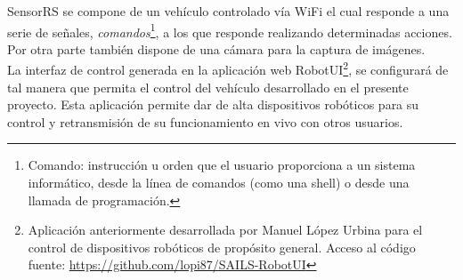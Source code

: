 SensorRS se compone de un vehículo controlado vía WiFi el cual responde a una serie de señales, \emph{comandos}\footnote{ Comando: instrucción u orden que el usuario proporciona a un sistema informático, 
desde la línea de comandos (como una shell) o desde una llamada de programación.}, a los que responde realizando determinadas acciones. Por otra parte también dispone de una cámara para la captura de imágenes.\\

La interfaz de control generada en la aplicación web RobotUI\footnote{ Aplicación anteriormente desarrollada por Manuel López Urbina para el control de dispositivos robóticos de propósito general. Acceso al 
código fuente: \url{https://github.com/lopi87/SAILS-RobotUI}}, se configurará de tal manera que permita el control del vehículo desarrollado en el presente proyecto. 
Esta aplicación permite dar de alta dispositivos robóticos para su control y retransmisión de su funcionamiento en vivo con otros usuarios.\\


